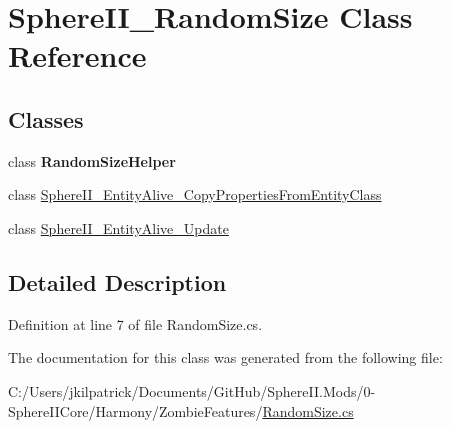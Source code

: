 \hypertarget{class_sphere_i_i___random_size}{}\section{Sphere\+I\+I\+\_\+\+Random\+Size Class Reference}
\label{class_sphere_i_i___random_size}
\subsection*{Classes}
\begin{DoxyCompactItemize}
\item 
class {\bfseries Random\+Size\+Helper}
\item 
class \mbox{\hyperlink{class_sphere_i_i___random_size_1_1_sphere_i_i___entity_alive___copy_properties_from_entity_class}{Sphere\+I\+I\+\_\+\+Entity\+Alive\+\_\+\+Copy\+Properties\+From\+Entity\+Class}}
\item 
class \mbox{\hyperlink{class_sphere_i_i___random_size_1_1_sphere_i_i___entity_alive___update}{Sphere\+I\+I\+\_\+\+Entity\+Alive\+\_\+\+Update}}
\end{DoxyCompactItemize}


\subsection{Detailed Description}


Definition at line 7 of file Random\+Size.\+cs.



The documentation for this class was generated from the following file\+:\begin{DoxyCompactItemize}
\item 
C\+:/\+Users/jkilpatrick/\+Documents/\+Git\+Hub/\+Sphere\+I\+I.\+Mods/0-\/\+Sphere\+I\+I\+Core/\+Harmony/\+Zombie\+Features/\mbox{\hyperlink{_random_size_8cs}{Random\+Size.\+cs}}\end{DoxyCompactItemize}
